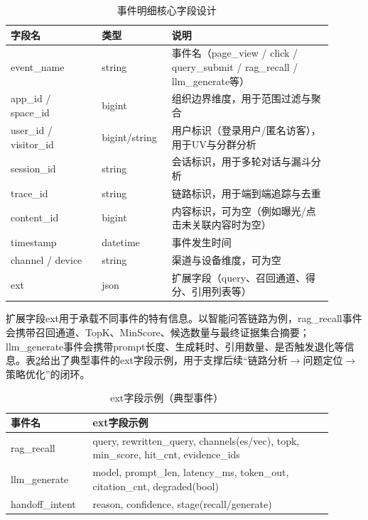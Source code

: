 \begin{table}[!htbp]
  \centering
  \caption{事件明细核心字段设计}
  \label{tab:di_event_schema}
  \small
  \begin{tabular}{>{\raggedright\arraybackslash}p{0.26\linewidth}|>{\raggedright\arraybackslash}p{0.18\linewidth}|>{\raggedright\arraybackslash}p{0.46\linewidth}}
    \hline
    字段名 & 类型 & 说明 \\ \hline
    event\_\allowbreak name & string & 事件名（page\_\allowbreak view / click / query\_\allowbreak submit / rag\_\allowbreak recall / llm\_\allowbreak generate等） \\ \hline
    app\_\allowbreak id / space\_\allowbreak id & bigint & 组织边界维度，用于范围过滤与聚合 \\ \hline
    user\_\allowbreak id / visitor\_\allowbreak id & bigint/string & 用户标识（登录用户/匿名访客），用于UV与分群分析 \\ \hline
    session\_\allowbreak id & string & 会话标识，用于多轮对话与漏斗分析 \\ \hline
    trace\_\allowbreak id & string & 链路标识，用于端到端追踪与去重 \\ \hline
    content\_\allowbreak id & bigint & 内容标识，可为空（例如曝光/点击未关联内容时为空） \\ \hline
    timestamp & datetime & 事件发生时间 \\ \hline
    channel / device & string & 渠道与设备维度，可为空 \\ \hline
    ext & json & 扩展字段（query、召回通道、得分、引用列表等） \\ \hline
  \end{tabular}
\end{table}

扩展字段ext用于承载不同事件的特有信息。以智能问答链路为例，rag\_\allowbreak recall事件会携带召回通道、TopK、MinScore、候选数量与最终证据集合摘要；llm\_\allowbreak generate事件会携带prompt长度、生成耗时、引用数量、是否触发退化等信息。表\ref{tab:di_event_ext}给出了典型事件的ext字段示例，用于支撑后续“链路分析$\rightarrow$问题定位$\rightarrow$策略优化”的闭环。

\begin{table}[!htbp]
  \centering
  \caption{ext字段示例（典型事件）}
  \label{tab:di_event_ext}
  \small
  \begin{tabular}{>{\raggedright\arraybackslash}p{0.22\linewidth}|>{\raggedright\arraybackslash}p{0.68\linewidth}}
    \hline
    事件名 & ext字段示例 \\ \hline
    rag\_\allowbreak recall & query, rewritten\_\allowbreak query, channels(es/vec), topk, min\_\allowbreak score, hit\_\allowbreak cnt, evidence\_\allowbreak ids \\ \hline
    llm\_\allowbreak generate & model, prompt\_\allowbreak len, latency\_\allowbreak ms, token\_\allowbreak out, citation\_\allowbreak cnt, degraded(bool) \\ \hline
    handoff\_\allowbreak intent & reason, confidence, stage(recall/generate) \\ \hline
  \end{tabular}
\end{table}

